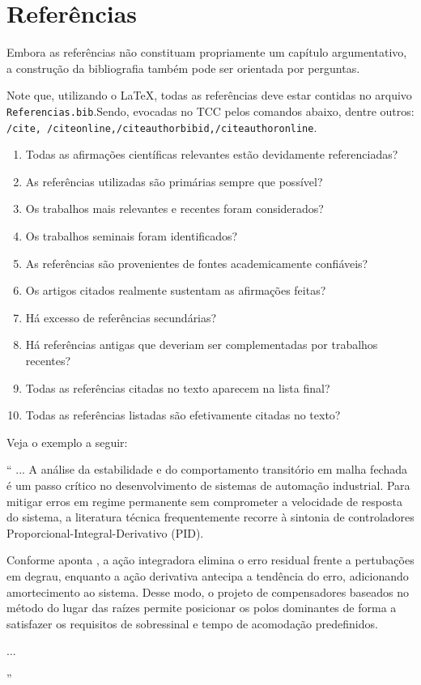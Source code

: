 \section{Referências}

Embora as referências não constituam propriamente um capítulo argumentativo,
a construção da bibliografia também pode ser orientada por perguntas.

Note que, utilizando o \LaTeX, todas as referências deve estar contidas no arquivo \texttt{Referencias.bib}.Sendo, evocadas no TCC pelos comandos abaixo, dentre outros: 
\texttt{/\/cite{}, /\/citeonline{},/\/citeauthor{bibid},/\/citeauthoronline{}}.


\begin{enumerate}
	\item Todas as afirmações científicas relevantes estão devidamente referenciadas?
	\item As referências utilizadas são primárias sempre que possível?
	\item Os trabalhos mais relevantes e recentes foram considerados?
	\item Os trabalhos seminais foram identificados?
	\item As referências são provenientes de fontes academicamente confiáveis?
	\item Os artigos citados realmente sustentam as afirmações feitas?
	\item Há excesso de referências secundárias?
	\item Há referências antigas que deveriam ser complementadas por trabalhos recentes?
	\item Todas as referências citadas no texto aparecem na lista final?
	\item Todas as referências listadas são efetivamente citadas no texto?
\end{enumerate}

Veja o exemplo a seguir:

``
...
A análise da estabilidade e do comportamento transitório em malha fechada é um passo crítico no desenvolvimento de sistemas de automação industrial. Para mitigar erros em regime permanente sem comprometer a velocidade de resposta do sistema, a literatura técnica frequentemente recorre à sintonia de controladores Proporcional-Integral-Derivativo (PID). 

Conforme aponta , a ação integradora elimina o erro residual frente a pertubações em degrau, enquanto a ação derivativa antecipa a tendência do erro, adicionando amortecimento ao sistema. Desse modo, o projeto de compensadores baseados no método do lugar das raízes \cite{ogata1998engenharia} permite posicionar os polos dominantes de forma a satisfazer os requisitos de sobressinal e tempo de acomodação predefinidos.

...

''